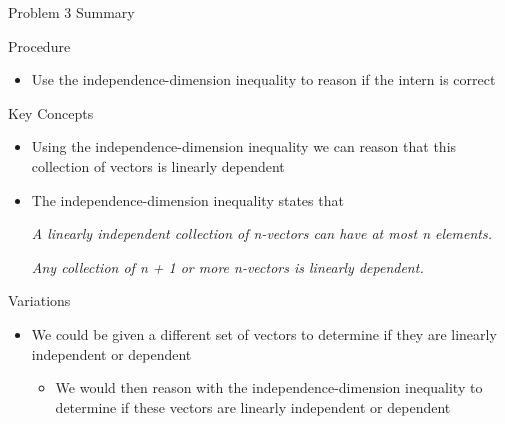 \begin{summary}{Problem 3 Summary}
    \begin{statement}{Procedure}
        \begin{itemize}
            \item Use the independence-dimension inequality to reason if the intern is correct
        \end{itemize}
    \end{statement}
    \begin{statement}{Key Concepts}
        \begin{itemize}
            \item Using the independence-dimension inequality we can reason that this collection of vectors is linearly dependent
            \item The independence-dimension inequality states that
            \begin{center}
                \textit{A linearly independent collection of n-vectors can have at most n elements.}
            \end{center}
            \begin{center}
                \textit{Any collection of n + 1 or more n-vectors is linearly dependent.}
            \end{center}
        \end{itemize}
    \end{statement}
    \begin{statement}{Variations}
        \begin{itemize}
            \item We could be given a different set of vectors to determine if they are linearly independent or dependent
            \begin{itemize}
                \item We would then reason with the independence-dimension inequality to determine if these vectors are linearly independent or dependent
            \end{itemize}
        \end{itemize}
    \end{statement}
\end{summary}

